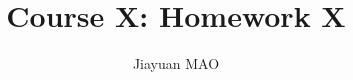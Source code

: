 \documentclass[a4paper, 12pt]{article}
\begin{document}
\setlength{\parindent}{2em}

\title{Course X: Homework X}
\author{Jiayuan MAO} 
\date{}
\maketitle


\end{document}
